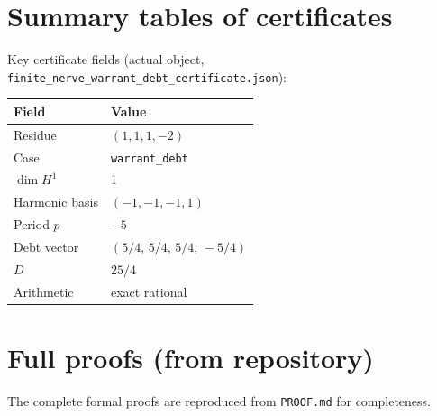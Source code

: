 \documentclass[11pt]{article}
\begin{document}
\section{Summary tables of certificates}
\label{app:certs}
Key certificate fields (actual object, \texttt{finite\_nerve\_warrant\_debt\_certificate.json}):
\begin{center}
\begin{tabular}{ll}
\toprule
Field & Value \\
\midrule
Residue & $(1,1,1,-2)$ \\
Case & \texttt{warrant\_debt} \\
$\dim H^1$ & 1 \\
Harmonic basis & $(-1,-1,-1,1)$ \\
Period $p$ & $-5$ \\
Debt vector & $(5/4,\,5/4,\,5/4,\,-5/4)$ \\
$D$ & $25/4$ \\
Arithmetic & exact rational \\
\bottomrule
\end{tabular}
\end{center}

\section{Full proofs (from repository)}
\label{app:proof}
The complete formal proofs are reproduced from \texttt{PROOF.md} for completeness.

\end{document}
